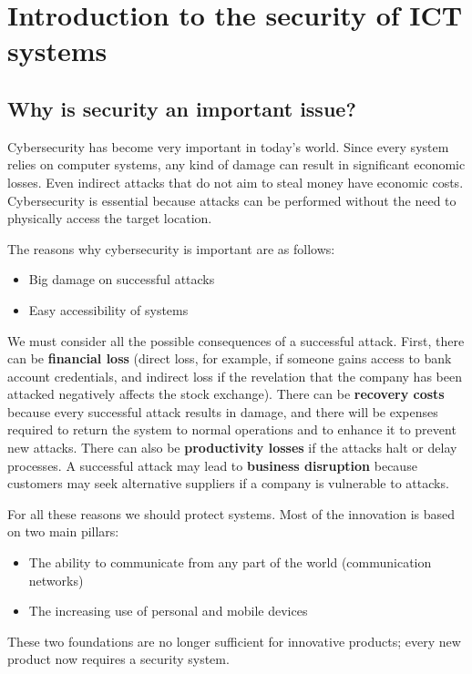 \chapter{Introduction to the security of
  ICT systems}

\section{Why is security an important issue?}
Cybersecurity has become very important in today's world. Since every system relies on computer systems, any kind of damage can result in significant economic losses. Even indirect attacks that do not aim to steal money have economic costs. Cybersecurity is essential because attacks can be performed without the need to physically access the target location.


The reasons why cybersecurity is important are as follows:
\begin{itemize}
  \item Big damage on successful attacks
  \item Easy accessibility of systems
\end{itemize}

We must consider all the possible consequences of a successful attack. First, there can be \textbf{financial loss} (direct loss, for example, if someone gains access to bank account credentials, and indirect loss if the revelation that the company has been attacked negatively affects the stock exchange). There can be \textbf{recovery costs} because every successful attack results in damage, and there will be expenses required to return the system to normal operations and to enhance it to prevent new attacks. There can also be \textbf{productivity losses} if the attacks halt or delay processes. A successful attack may lead to \textbf{business disruption} because customers may seek alternative suppliers if a company is vulnerable to attacks.


For all these reasons we should protect systems. Most of the innovation is based on two main pillars:
\begin{itemize}
  \item The ability to communicate from any part of the world (communication networks)
  \item The increasing use of personal and mobile devices
\end{itemize}
These two foundations are no longer sufficient for innovative products; every new product now requires a security system.


